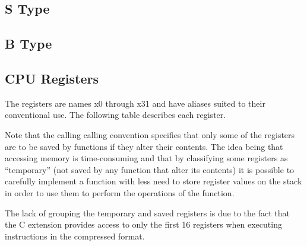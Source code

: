 \subsection{S Type}
\label{insnformat:stype}

\subsection{B Type}
\label{insnformat:btype}





\subsection{CPU Registers}
\label{cpuregs}

The registers are names x0 through x31 and have aliases suited to their 
conventional use.  The following table describes each register.  

Note 
that the calling calling convention specifies that only some 
of the registers are to be saved by functions if they alter their contents.
The idea being that accessing memory is time-consuming and that by
classifying some registers as ``temporary'' (not saved by any function
that alter its contents) it is possible to carefully implement a function
with less need to store register values on the stack in order to use them
to perform the operations of the function.

The lack of grouping the temporary and saved registers is due to the
fact that the C extension %
provides access to only the first 16 registers when executing instructions 
in the compressed format.  


